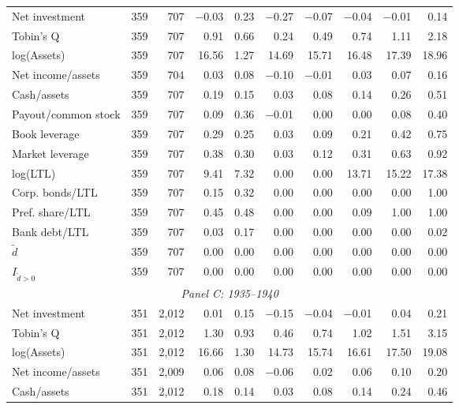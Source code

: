 \begin{table}[p]
\begin{threeparttable}
\begin{tabular}{lrrrrrrrrr}
            \midrule
            Net investment & 359 & 707 & $-$0.03 & 0.23 & $-$0.27 & $-$0.07 & $-$0.04 & $-$0.01 & 0.14 \\
            Tobin's Q & 359 & 707 & 0.91 & 0.66 & 0.24 & 0.49 & 0.74 & 1.11 & 2.18 \\
            log(Assets) & 359 & 707 & 16.56 & 1.27 & 14.69 & 15.71 & 16.48 & 17.39 & 18.96 \\
            Net income/assets & 359 & 704 & 0.03 & 0.08 & $-$0.10 & $-$0.01 & 0.03 & 0.07 & 0.16 \\
            Cash/assets & 359 & 707 & 0.19 & 0.15 & 0.03 & 0.08 & 0.14 & 0.26 & 0.51 \\
            Payout/common stock & 359 & 707 & 0.09 & 0.36 & $-$0.01 & 0.00 & 0.00 & 0.08 & 0.40 \\
            Book leverage & 359 & 707 & 0.29 & 0.25 & 0.03 & 0.09 & 0.21 & 0.42 & 0.75 \\
            Market leverage & 359 & 707 & 0.38 & 0.30 & 0.03 & 0.12 & 0.31 & 0.63 & 0.92 \\
            log(LTL) & 359 & 707 & 9.41 & 7.32 & 0.00 & 0.00 & 13.71 & 15.22 & 17.38 \\
            Corp. bonds/LTL & 359 & 707 & 0.15 & 0.32 & 0.00 & 0.00 & 0.00 & 0.00 & 1.00 \\
            Pref. share/LTL & 359 & 707 & 0.45 & 0.48 & 0.00 & 0.00 & 0.09 & 1.00 & 1.00 \\
            Bank debt/LTL & 359 & 707 & 0.03 & 0.17 & 0.00 & 0.00 & 0.00 & 0.00 & 0.02 \\
            \ensuremath{\tilde{d}} & 359 & 707 & 0.00 & 0.00 & 0.00 & 0.00 & 0.00 & 0.00 & 0.00 \\
            \ensuremath{I_{\tilde{d}>0}} & 359 & 707 & 0.00 & 0.00 & 0.00 & 0.00 & 0.00 & 0.00 & 0.00 \\
            \midrule
            \multicolumn{10}{c}{\textit{Panel C: 1935--1940}} \\
            \midrule
            Net investment & 351 & 2,012 & 0.01 & 0.15 & $-$0.15 & $-$0.04 & $-$0.01 & 0.04 & 0.21 \\
            Tobin's Q & 351 & 2,012 & 1.30 & 0.93 & 0.46 & 0.74 & 1.02 & 1.51 & 3.15 \\
            log(Assets) & 351 & 2,012 & 16.66 & 1.30 & 14.73 & 15.74 & 16.61 & 17.50 & 19.08 \\
            Net income/assets & 351 & 2,009 & 0.06 & 0.08 & $-$0.06 & 0.02 & 0.06 & 0.10 & 0.20 \\
            Cash/assets & 351 & 2,012 & 0.18 & 0.14 & 0.03 & 0.08 & 0.14 & 0.24 & 0.46 \\

\end{tabular}
\end{threeparttable}
\end{table}
